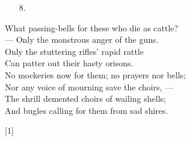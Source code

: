 \documentclass{article}
\begin{document}
\begin{multicols}{2}

    \begin{turn}{90}
        \begin{minipage}{1cm}
            \begin{enumerate}[itemsep=1.6ex]
                \item[]
                \item[] 
                \item[] 
                \item[] 
                \item[8.] 
                \item[]
            \end{enumerate}
        \end{minipage}

        \begin{minipage}{8cm}
                What passing-bells for these who die as cattle?\\
                    --- Only the monstrous anger of the guns.\\
                Only the stuttering rifles' rapid rattle\\
                Can patter out their hasty orisons.\\
                No mockeries now for them; no prayers nor bells;\\
                Nor any voice of mourning save the choirs, --- \\
                The shrill demented choirs of wailing shells;\\
                And bugles calling for them from sad shires.\\

                \begin{center}[1]\end{center}
        \end{minipage}
    \end{turn}

\end{multicols}

\vspace*{\fill}
\end{document}
